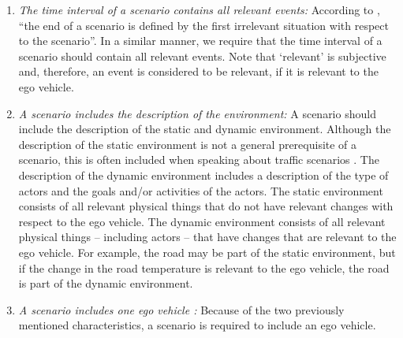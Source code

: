 \begin{enumerate}
	\item\textit{The time interval of a scenario contains all relevant events:}
	According to \textcite{geyer2014}, ``the end of a scenario is defined by the first irrelevant situation with respect to the scenario''. In a similar manner, we require that the time interval of a scenario should contain all relevant events. Note that `relevant' is subjective and, therefore, an event is considered to be relevant, if it is relevant to the ego vehicle.

	\item\textit{A scenario includes the description of the environment:}
	A scenario should include the description of the static and dynamic environment.
	Although the description of the static environment is not a general prerequisite of a scenario, this is often included when speaking about traffic scenarios \autocite{geyer2014, ulbrich2015, elrofai2016scenario, ebner2011identifying, althoff2017CommonRoad}.
	The description of the dynamic environment includes a description of the type of actors and the goals and/or activities of the actors.
	\cstartb The static environment consists of all relevant physical things that do not have relevant changes with respect to the ego vehicle. The dynamic environment consists of all relevant physical things -- including actors -- that have changes that are relevant to the ego vehicle. For example, the road may be part of the static environment, but if the change in the road temperature is relevant to the ego vehicle, the road is part of the dynamic environment.\cendb
	
	\cstartb
	\item\textit{A scenario includes one ego vehicle \autocite{geyer2014, elrofai2016scenario}:}
	Because of the two previously mentioned characteristics, a scenario is required to include an ego vehicle.
	\cendb
	
	

\end{enumerate}
